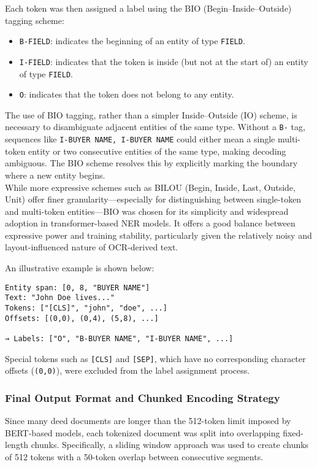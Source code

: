\documentclass{article}
\begin{document}
Each token was then assigned a label using the BIO (Begin–Inside–Outside) tagging scheme:
\begin{itemize}
    \item \texttt{B-FIELD}: indicates the beginning of an entity of type \texttt{FIELD}.
    \item \texttt{I-FIELD}: indicates that the token is inside (but not at the start of) an entity of type \texttt{FIELD}.
    \item \texttt{O}: indicates that the token does not belong to any entity.
\end{itemize}

The use of BIO tagging, rather than a simpler Inside–Outside (IO) scheme, is necessary to disambiguate adjacent entities of the same type. Without a \texttt{B-} tag, sequences like \texttt{I-BUYER NAME, I-BUYER NAME} could either mean a single multi-token entity or two consecutive entities of the same type, making decoding ambiguous. The BIO scheme resolves this by explicitly marking the boundary where a new entity begins. \\

While more expressive schemes such as BILOU (Begin, Inside, Last, Outside, Unit) offer finer granularity—especially for distinguishing between single-token and multi-token entities—BIO was chosen for its simplicity and widespread adoption in transformer-based NER models. It offers a good balance between expressive power and training stability, particularly given the relatively noisy and layout-influenced nature of OCR-derived text.

An illustrative example is shown below:
\begin{verbatim}
Entity span: [0, 8, "BUYER NAME"]
Text: "John Doe lives..."
Tokens: ["[CLS]", "john", "doe", ...]
Offsets: [(0,0), (0,4), (5,8), ...]

→ Labels: ["O", "B-BUYER NAME", "I-BUYER NAME", ...]
\end{verbatim}

Special tokens such as \texttt{[CLS]} and \texttt{[SEP]}, which have no corresponding character offsets (\texttt{(0,0)}), were excluded from the label assignment process.


\subsubsection{Final Output Format and Chunked Encoding Strategy}

Since many deed documents are longer than the 512-token limit imposed by BERT-based models, each tokenized document was split into overlapping fixed-length chunks. Specifically, a sliding window approach was used to create chunks of 512 tokens with a 50-token overlap between consecutive segments. \\
\end{document}
